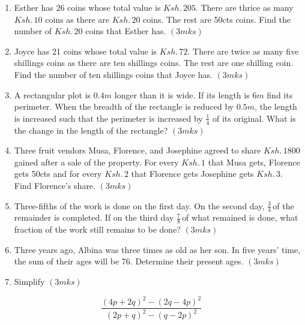 \documentclass[
  a4paperpaper,
]{scrbook}
\begin{document}
\begin{tcolorbox}[enhanced jigsaw, left=2mm, colframe=quarto-callout-note-color-frame, toptitle=1mm, opacitybacktitle=0.6, rightrule=.15mm, colbacktitle=quarto-callout-note-color!10!white, colback=white, arc=.35mm, breakable, leftrule=.75mm, bottomtitle=1mm, bottomrule=.15mm, title=\textcolor{quarto-callout-note-color}{\faInfo}\hspace{0.5em}{Problems to Solve}, titlerule=0mm, coltitle=black, toprule=.15mm, opacityback=0]

\begin{enumerate}
\def\labelenumi{\arabic{enumi}.}
\item
  Esther has \(26\) coins whose total value is \(Ksh.\,205\). There are
  thrice as many \(Ksh.\,10\) coins as there are \(Ksh.\,20\) coins. The
  rest are 50cts coins. Find the number of \(Ksh.\,20\) coins that
  Esther has. \((3mks)\)
\item
  Joyce has 21 coins whose total value is \(Ksh. \,72\). There are twice
  as many five shillings coins as there are ten shillings coins. The
  rest are one shilling coin. Find the number of ten shillings coins
  that Joyce has. \((3 mks)\)
\item
  A rectangular plot is \(0.4 m\) longer than it is wide. If its length
  is \(6m\) find its perimeter. When the breadth of the rectangle is
  reduced by \(0.5m\), the length is increased such that the perimeter
  is increased by \(\frac{1}{4}\) of its original. What is the change in
  the length of the rectangle? \((3 mks)\)
\item
  Three fruit vendors Musa, Florence, and Josephine agreed to share
  \(Ksh.\,1800\) gained after a sale of the property. For every
  \(Ksh.\, 1\) that Musa gets, Florence gets 50cts and for every
  \(Ksh.\,2\) that Florence gets Josephine gets \(Ksh.\,3\). Find
  Florence's share. \((3mks)\)
\item
  Three-fifths of the work is done on the first day. On the second day,
  \(\frac{3}{4} \,\)of the remainder is completed. If on the third day
  \(\frac{7}{8} \,\)of what remained is done, what fraction of the work
  still remains to be done? \((3mks)\)
\item
  Three years ago, Albina was three times as old as her son. In five
  years' time, the sum of their ages will be 76. Determine their present
  ages. \((3mks)\)
\item
  Simplify \((3mks)\)
\end{enumerate}

\[\frac{(4p+2q)^2-(2q-4p)^2}{(2p+q)^2-(q-2p)^2} \]


\end{tcolorbox}
\end{document}
